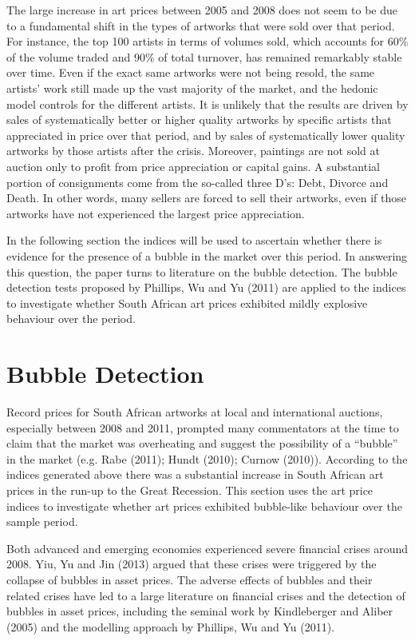 \documentclass[12pt,]{article}
\begin{document}
The large increase in art prices between 2005 and 2008 does not seem to
be due to a fundamental shift in the types of artworks that were sold
over that period. For instance, the top 100 artists in terms of volumes
sold, which accounts for 60\% of the volume traded and 90\% of total
turnover, has remained remarkably stable over time. Even if the exact
same artworks were not being resold, the same artists' work still made
up the vast majority of the market, and the hedonic model controls for
the different artists. It is unlikely that the results are driven by
sales of systematically better or higher quality artworks by specific
artists that appreciated in price over that period, and by sales of
systematically lower quality artworks by those artists after the crisis.
Moreover, paintings are not sold at auction only to profit from price
appreciation or capital gains. A substantial portion of consignments
come from the so-called three D's: Debt, Divorce and Death. In other
words, many sellers are forced to sell their artworks, even if those
artworks have not experienced the largest price appreciation.

In the following section the indices will be used to ascertain whether
there is evidence for the presence of a bubble in the market over this
period. In answering this question, the paper turns to literature on the
bubble detection. The bubble detection tests proposed by Phillips, Wu
and Yu (2011) are applied to the indices to investigate whether South
African art prices exhibited mildly explosive behaviour over the period.

\section{Bubble Detection}\label{bubble-detection}

Record prices for South African artworks at local and international
auctions, especially between 2008 and 2011, prompted many commentators
at the time to claim that the market was overheating and suggest the
possibility of a ``bubble'' in the market (e.g. Rabe (2011); Hundt
(2010); Curnow (2010)). According to the indices generated above there
was a substantial increase in South African art prices in the run-up to
the Great Recession. This section uses the art price indices to
investigate whether art prices exhibited bubble-like behaviour over the
sample period.

Both advanced and emerging economies experienced severe financial crises
around 2008. Yiu, Yu and Jin (2013) argued that these crises were
triggered by the collapse of bubbles in asset prices. The adverse
effects of bubbles and their related crises have led to a large
literature on financial crises and the detection of bubbles in asset
prices, including the seminal work by Kindleberger and Aliber (2005) and
the modelling approach by Phillips, Wu and Yu (2011).
\end{document}
